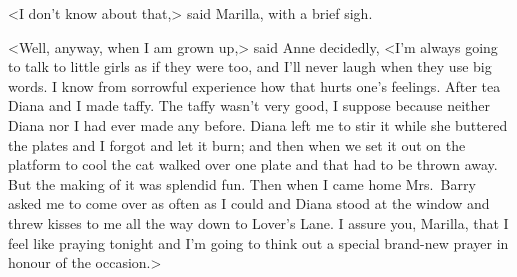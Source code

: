 <I don't know about that,> said Marilla, with a brief sigh.

<Well, anyway, when I am grown up,> said Anne decidedly, <I'm always going to talk to little girls as if they were too, and I'll never laugh when they use big words. I know from sorrowful experience how that hurts one's feelings. After tea Diana and I made taffy. The taffy wasn't very good, I suppose because neither Diana nor I had ever made any before. Diana left me to stir it while she buttered the plates and I forgot and let it burn; and then when we set it out on the platform to cool the cat walked over one plate and that had to be thrown away. But the making of it was splendid fun. Then when I came home Mrs.~Barry asked me to come over as often as I could and Diana stood at the window and threw kisses to me all the way down to Lover's Lane. I assure you, Marilla, that I feel like praying tonight and I'm going to think out a special brand-new prayer in honour of the occasion.>